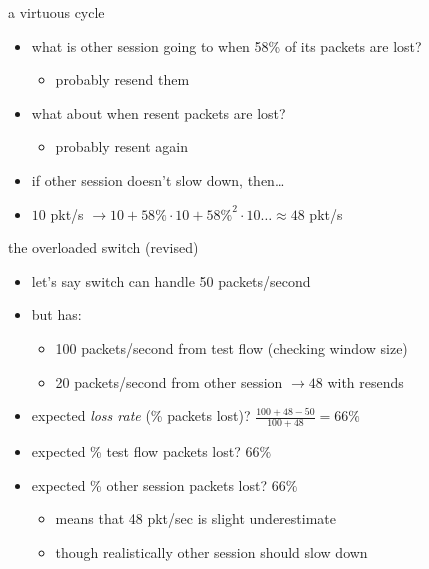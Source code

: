\begin{frame}{a virtuous cycle}
\begin{itemize}
\item what is other session going to when 58\% of its packets are lost?
    \begin{itemize}
    \item probably resend them
    \end{itemize}
\item what about when resent packets are lost?
    \begin{itemize}
    \item probably resent again
    \end{itemize}
\vspace{.5cm}
\item if other session doesn't slow down, then\ldots
\item $10$ pkt/s $\rightarrow10+58\%\cdot10+58\%^2\cdot10 \ldots\approx 48$ pkt/s
\end{itemize}
\end{frame}


\begin{frame}{the overloaded switch (revised)}
\begin{itemize}
\item let's say switch can handle 50 packets/second
\item but has:
    \begin{itemize}
    \item 100 packets/second from test flow (checking window size) 
    \item 20 packets/second from other session $\rightarrow 48$ with resends
    \end{itemize}
\item expected \textit{loss rate} (\% packets lost)? $\frac{100+48-50}{100+48}=66\%$
\item expected \% test flow packets lost? $66\%$
\item expected \% other session packets lost? $66\%$
    \begin{itemize}
    \item<2-> means that 48 pkt/sec is slight underestimate
    \item<2-> though realistically other session should slow down
    \end{itemize}
\end{itemize}
\end{frame}

